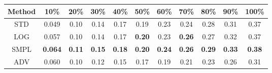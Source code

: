 \documentclass{standalone}
\begin{document}
\begin{tabular}{c|cccccccccc}
      \toprule
      Method & 10\% & 20\% & 30\% & 40\% & 50\% & 60\% & 70\% & 80\% & 90\% & 100\% \\
      \midrule
STD & 0.049 & 0.10 & 0.14 & 0.17 & 0.19 & 0.23 & 0.24 & 0.28 & 0.31 & 0.37\\
LOG & 0.057 & 0.10 & 0.14 & 0.17 & \textbf{0.20} & 0.23 & \textbf{0.26} & 0.27 & 0.32 & 0.37\\
SMPL & \textbf{0.064} & \textbf{0.11} & \textbf{0.15} & \textbf{0.18} & \textbf{0.20} & \textbf{0.24} & \textbf{0.26} & \textbf{0.29} & \textbf{0.33} & \textbf{0.38}\\
ADV & 0.060 & 0.10 & 0.12 & 0.15 & 0.17 & 0.19 & 0.21 & 0.23 & 0.26 & 0.31\\
  \bottomrule
\end{tabular}
\end{document}
